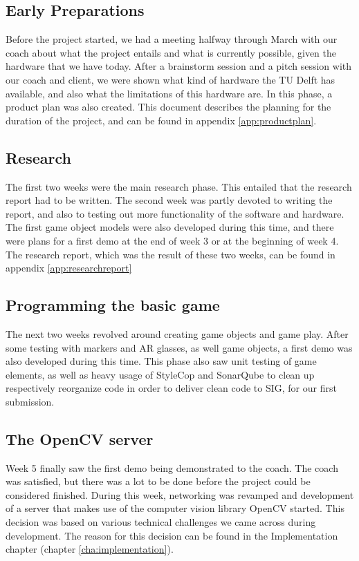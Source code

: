 		\subsection{Early Preparations} \label{ssec:preparations}
			Before the project started, we had a meeting halfway through March
			with our coach about what the project entails and what is currently
			possible, given the hardware that we have today. After a brainstorm
			session and a pitch session with our coach and client, we were shown 
			what kind of hardware the TU Delft has available, and also what the 
			limitations of this hardware are. In this phase, a product plan was
			also created. This document describes the planning for the duration
			of the project, and can be found in appendix \ref{app:productplan}.
		
		\subsection{Research} \label{ssec:research}
			The first two weeks were the main research phase. This entailed that the
			research report had to be written. The second week was partly devoted
			to writing the report, and also to testing out more functionality of
			the software and hardware. The first game object models were also
			developed during this time, and there were plans for a first demo at the end
			of week 3 or at the beginning of week 4. The research report, which was the 
			result of these two weeks, can be found in appendix \ref{app:researchreport}
		
		\subsection{Programming the basic game} \label{ssec:basics}
			The next two weeks revolved around creating game objects and game play.
			After some testing with markers and AR glasses, as well game objects, a 
			first demo was also developed during this time. This phase also saw unit testing of game
			elements, as well as heavy usage of StyleCop and SonarQube to clean up
			respectively reorganize code in order to deliver clean code to SIG, for our first
			submission.  
		
		\subsection{The OpenCV server} \label{ssec:firstdemo}
			Week 5 finally saw the first demo being demonstrated to the coach. The
			coach was satisfied, but there was a lot to be done before the project
			could be considered finished. During this week, networking was revamped
			and development of a server that makes use of the computer vision library
			OpenCV started. This decision was based on various technical challenges we 
			came across during development. The reason for this decision can be found 
			in the Implementation chapter (chapter \ref{cha:implementation}).
		
